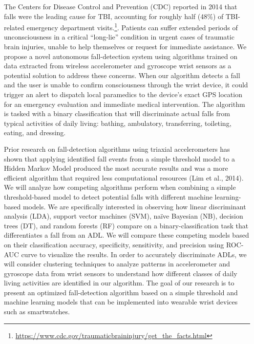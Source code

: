 \documentclass{llncs}
\begin{document}
	The Centers for Disease Control and Prevention (CDC) reported in 2014 that falls were the leading cause for TBI, accounting for roughly half (48\%) of TBI-related emergency department visits.\footnote{\url{https://www.cdc.gov/traumaticbraininjury/get_the_facts.html}}. Patients can suffer extended periods of unconsciousness in a critical ``long-lie'' condition in urgent cases of traumatic brain injuries, unable to help themselves or request for immediate assistance. We propose a novel autonomous fall-detection system using algorithms trained on data extracted from wireless accelerometer and gyroscope wrist sensors as a potential solution to address these concerns. When our algorithm detects a fall and the user is unable to confirm consciousness through the wrist device, it could trigger an alert to dispatch local paramedics to the device's exact GPS location for an emergency evaluation and immediate medical intervention. The algorithm is tasked with a binary classification that will discriminate actual falls from typical activities of daily living: bathing, ambulatory, transferring, toileting, eating, and dressing.
	 
	Prior research on fall-detection algorithms using triaxial accelerometers has shown that applying identified fall events from a simple threshold model to a Hidden Markov Model produced the most accurate results and was a more efficient algorithm that required less computational resources (Lim et al., 2014).\cite{lim2014fall} We will analyze how competing algorithms perform when combining a simple threshold-based model to detect potential falls with different machine learning-based models. We are specifically interested in observing how linear discriminant analysis (LDA), support vector machines (SVM), naïve Bayesian (NB), decision trees (DT), and random forests (RF) compare on a binary-classification task that differentiates a fall from an ADL. We will compare these competing models based on their classification accuracy, specificity, sensitivity, and precision using ROC-AUC curve to visualize the results. In order to accurately discriminate ADLs, we will consider clustering techniques to analyze patterns in accelerometer and gyroscope data from wrist sensors to understand how different classes of daily living activities are identified in our algorithm. The goal of our research is to present an optimized fall-detection algorithm based on a simple threshold and machine learning models that can be implemented into wearable wrist devices such as smartwatches. 
	
\end{document}
